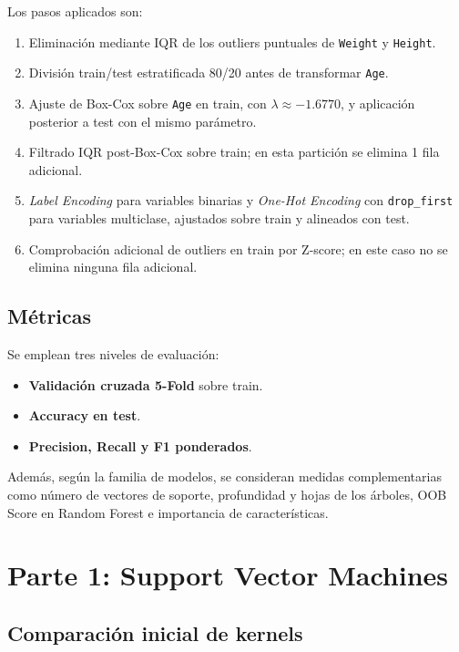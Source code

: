 \documentclass[11pt,a4paper]{article}
\newcommand{\tbl}[3]{
\begin{table}[H]
\centering
\caption{#2}
\label{#3}
\scriptsize

\end{table}
}
\begin{document}
Los pasos aplicados son:
\begin{enumerate}
    \item Eliminación mediante IQR de los outliers puntuales de \texttt{Weight} y \texttt{Height}.
    \item División train/test estratificada 80/20 antes de transformar \texttt{Age}.
    \item Ajuste de Box-Cox sobre \texttt{Age} en train, con \(\lambda \approx -1.6770\), y aplicación posterior a test con el mismo parámetro.
    \item Filtrado IQR post-Box-Cox sobre train; en esta partición se elimina 1 fila adicional.
    \item \textit{Label Encoding} para variables binarias y \textit{One-Hot Encoding} con \texttt{drop\_first} para variables multiclase, ajustados sobre train y alineados con test.
    \item Comprobación adicional de outliers en train por Z-score; en este caso no se elimina ninguna fila adicional.
\end{enumerate}

\subsection{Métricas}

Se emplean tres niveles de evaluación:
\begin{itemize}
    \item \textbf{Validación cruzada 5-Fold} sobre train.
    \item \textbf{Accuracy en test}.
    \item \textbf{Precision, Recall y F1 ponderados}.
\end{itemize}

Además, según la familia de modelos, se consideran medidas complementarias como número de vectores de soporte, profundidad y hojas de los árboles, OOB Score en Random Forest e importancia de características.

\section{Parte 1: Support Vector Machines}

\subsection{Comparación inicial de kernels}

\tbl{svm_kernels}{Comparativa inicial de SVM con kernels por defecto.}{tab:svm_kernels}
\end{document}
